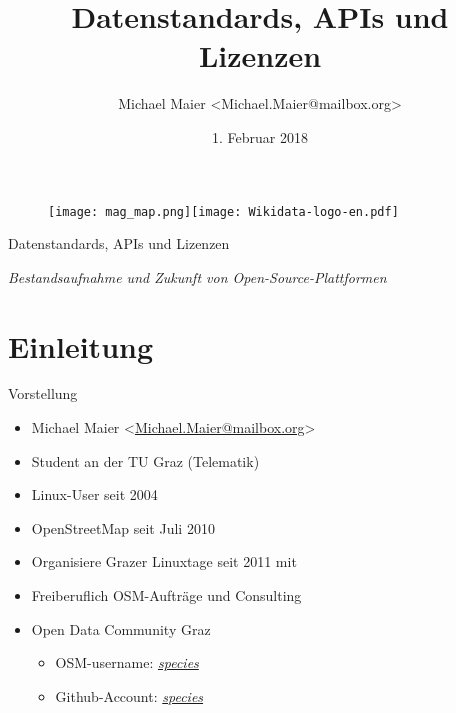 \documentclass{beamer}
\title{Datenstandards, APIs und Lizenzen}
\author{Michael Maier \textless Michael.Maier@mailbox.org\textgreater}
\date{1. Februar 2018}
\begin{document}

\begin{frame} 


\begin{figure}
  \centering
  \texttt{[image: mag\_map.png]}\texttt{[image: Wikidata-logo-en.pdf]}
\end{figure}


\begin{center}
\Huge{Datenstandards, APIs und Lizenzen\\}
\end{center}

\begin{center}
\Large{\emph{Bestandsaufnahme und Zukunft von Open-Source-Plattformen}}
\end{center}

\end{frame}


\section{Einleitung}

\begin{frame}{Vorstellung}

  \begin{itemize}
    \item Michael Maier \textless \href{mailto:Michael.Maier@mailbox.org}{Michael.Maier@mailbox.org}\textgreater
    \item Student an der TU Graz (Telematik)
\vspace{0.3cm}
    \item Linux-User seit 2004
    \item OpenStreetMap seit Juli 2010
    \item Organisiere Grazer Linuxtage seit 2011 mit
\vspace{0.3cm}
    \item Freiberuflich OSM-Aufträge und Consulting
    \item Open Data Community Graz
    \begin{itemize}
      \item OSM-username: \emph{\href{http://www.openstreetmap.org/user/species}{species}}
      \item Github-Account: \emph{\href{https://github.com/species}{species}}
    \end{itemize}
  \end{itemize}
\end{frame}
\end{document}
